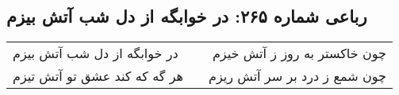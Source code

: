 \begin{center}
\section*{رباعی شماره ۲۶۵: در خوابگه از دل شب آتش بیزم}
\label{sec:sh265}
\begin{longtable}{l p{0.5cm} r}
در خوابگه از دل شب آتش بیزم
&&
چون خاکستر به روز ز آتش خیزم
\\
هر گه که کند عشق تو آتش تیزم
&&
چون شمع ز درد بر سر آتش ریزم
\\
\end{longtable}
\end{center}
